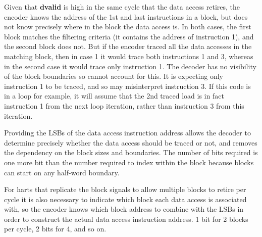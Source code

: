 Given that \textbf{dvalid} is high in the same cycle that the data access retires, the encoder knows the address of 
the 1st and last instructions in a block, but does not know precisely where in the block the data access is.  
In both cases, the first block matches the filtering criteria (it contains the address of instruction 1), and the second block does not.  
But if the encoder traced all the data accesses in the matching block, then in case 1 it would trace both instructions 1 and 3, whereas 
in the second case it would trace only instruction 1.  The decoder has no visibility of the block boundaries so cannot account for this.
It is expecting only instruction 1 to be traced, and so may misinterpret instruction 3.  If this code is in a loop for example, it will 
assume that the 2nd traced load is in fact instruction 1 from the next loop iteration, rather than instruction 3 from this iteration.
 
Providing the LSBs of the data access instruction address allows the decoder to determine precisely whether the data access should be 
traced or not, and removes the dependency on the block sizes and boundaries.  The number of bits required is one more bit than the 
number required to index within the block because blocks can start on any half-word boundary.
 
For harts that replicate the block signals to allow multiple blocks to retire per cycle it is also necessary to indicate which block 
each data access is associated with, so the encoder knows which block address to combine with the LSBs in order to construct the 
actual data access instruction address.  1 bit for 2 blocks per cycle, 2 bits for 4, and so on.

